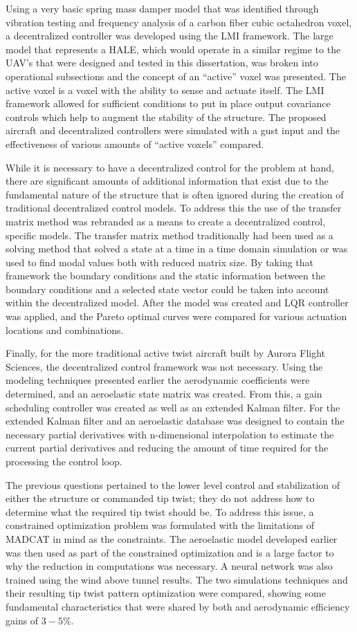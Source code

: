 \documentclass[11pt]{ucthesis}
\begin{document}
Using a very basic spring mass damper model that was identified through vibration testing and frequency analysis of a carbon fiber cubic octahedron voxel, a decentralized controller was developed using the LMI framework. The large model that represents a HALE, which would operate in a similar regime to the UAV's that were designed and tested in this dissertation, was broken into operational subsections and the concept of an ``active'' voxel was presented. The active voxel is a voxel with the ability to sense and actuate itself. The LMI framework allowed for sufficient conditions to put in place output covariance controls which help to augment the stability of the structure. The proposed aircraft and decentralized controllers were simulated with a gust input and the effectiveness of various amounts of ``active voxels'' compared.

While it is necessary to have a decentralized control for the problem at hand, there are significant amounts of additional information that exist due to the fundamental nature of the structure that is often ignored during the creation of traditional decentralized control models. To address this the use of the transfer matrix method was rebranded as a means to create a decentralized control, specific models. The transfer matrix method traditionally had been used as a solving method that solved a state at a time in a time domain simulation or was used to find modal values both with reduced matrix size. By taking that framework the boundary conditions and the static information between the boundary conditions and a selected state vector could be taken into account within the decentralized model. After the model was created and LQR controller was applied, and the Pareto optimal curves were compared for various actuation locations and combinations. 

Finally, for the more traditional active twist aircraft built by Aurora Flight Sciences, the decentralized control framework was not necessary. Using the modeling techniques presented earlier the aerodynamic coefficients were determined, and an aeroelastic state matrix was created. From this, a gain scheduling controller was created as well as an extended Kalman filter. For the extended Kalman filter and an aeroelastic database was designed to contain the necessary partial derivatives with n-dimensional interpolation to estimate the current partial derivatives and reducing the amount of time required for the processing the control loop.

The previous questions pertained to the lower level control and stabilization of either the structure or commanded tip twist; they do not address how to determine what the required tip twist should be. To address this issue, a constrained optimization problem was formulated with the limitations of MADCAT in mind as the constraints. The aeroelastic model developed earlier was then used as part of the constrained optimization and is a large factor to why the reduction in computations was necessary. A neural network was also trained using the wind above tunnel results. The two simulations techniques and their resulting tip twist pattern optimization were compared, showing some fundamental characteristics that were shared by both and aerodynamic efficiency gains of $3-5\%$.
\end{document}

